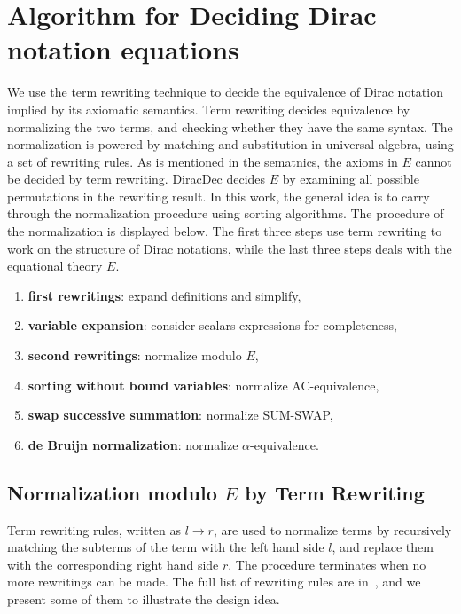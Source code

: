 \documentclass[runningheads]{llncs}
\begin{document}


\section{Algorithm for Deciding Dirac notation equations}
\label{sec: decide}

We use the term rewriting technique to decide the equivalence of Dirac notation implied by its axiomatic semantics.
Term rewriting decides equivalence by normalizing the two terms, and checking whether they have the same syntax.
The normalization is powered by matching and substitution in universal algebra, using a set of rewriting rules.
As is mentioned in the sematnics, the axioms in $E$ cannot be decided by term rewriting.
DiracDec decides $E$ by examining all possible permutations in the rewriting result.
In this work, the general idea is to carry through the normalization procedure using sorting algorithms. 
The procedure of the normalization is displayed below. 
The first three steps use term rewriting to work on the structure of Dirac notations, while the last three steps deals with the equational theory $E$.
\begin{enumerate}
    \item \textbf{first rewritings}: expand definitions and simplify,
    \item \textbf{variable expansion}: consider scalars expressions for completeness,
    \item \textbf{second rewritings}: normalize modulo $E$,
    \item \textbf{sorting without bound variables}: normalize AC-equivalence,
    \item \textbf{swap successive summation}: normalize SUM-SWAP,
    \item \textbf{de Bruijn normalization}: normalize $\alpha$-equivalence.
\end{enumerate}

% 


\subsection{Normalization modulo $E$ by Term Rewriting}
Term rewriting rules, written as $l \to r$, are used to normalize terms by recursively matching the subterms of the term with the left hand side $l$, and replace them with the corresponding right hand side $r$. The procedure terminates when no more rewritings can be made.
The full list of rewriting rules are in~, and we present some of them to illustrate the design idea.
\end{document}
